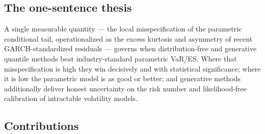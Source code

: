 \documentclass[11pt]{article}
\theoremstyle{remark}
\begin{document}
\subsection{The one-sentence thesis}

A single measurable quantity --- the local misspecification of the
parametric conditional tail, operationalized as the excess kurtosis and
asymmetry of recent GARCH-standardized residuals --- governs when
distribution-free and generative quantile methods beat industry-standard
parametric VaR/ES. Where that misspecification is high they win
decisively and with statistical significance; where it is low the
parametric model is as good or better; and generative methods
additionally deliver honest uncertainty on the risk number and
likelihood-free calibration of intractable volatility models.

\subsection{Contributions}\label{sec:contributions}
\end{document}
